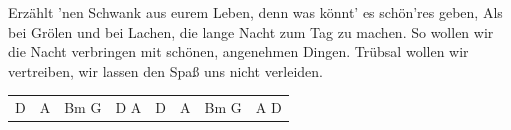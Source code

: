 \begin{guitar}
	Erzählt 'nen Schwank aus eurem Leben, denn was könnt' es schön'res geben,
	Als bei Grölen und bei Lachen, die lange Nacht zum Tag zu machen.
	So wollen wir die Nacht verbringen mit schönen, angenehmen Dingen.
	Trübsal wollen wir vertreiben, wir lassen den Spaß uns nicht verleiden.
	
	 
	
	\begin{highlightbar}
		  
	\end{highlightbar}
	
	 {\footnotesize\begin{tabular}{|l|l|l|l||l|l|l|l|}
			D & A & Bm G & D A & D & A & Bm G & A D
	\end{tabular}} 
\end{guitar}
\vfill
{\footnotesize {}}




